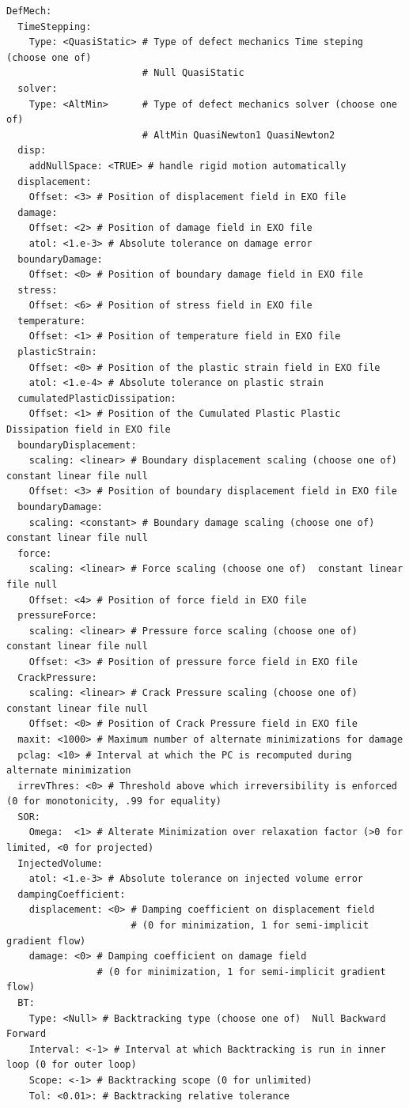 \documentclass[10pt,oneside]{report}
\begin{document}
\begin{verbatim}
DefMech:
  TimeStepping:
    Type: <QuasiStatic> # Type of defect mechanics Time steping (choose one of)  
                        # Null QuasiStatic
  solver:
    Type: <AltMin>      # Type of defect mechanics solver (choose one of)  
                        # AltMin QuasiNewton1 QuasiNewton2
  disp:
    addNullSpace: <TRUE> # handle rigid motion automatically  
  displacement:
    Offset: <3> # Position of displacement field in EXO file 
  damage:
    Offset: <2> # Position of damage field in EXO file 
    atol: <1.e-3> # Absolute tolerance on damage error 
  boundaryDamage:
    Offset: <0> # Position of boundary damage field in EXO file 
  stress:
    Offset: <6> # Position of stress field in EXO file 
  temperature:
    Offset: <1> # Position of temperature field in EXO file 
  plasticStrain:
    Offset: <0> # Position of the plastic strain field in EXO file 
    atol: <1.e-4> # Absolute tolerance on plastic strain
  cumulatedPlasticDissipation:
    Offset: <1> # Position of the Cumulated Plastic Plastic Dissipation field in EXO file 
  boundaryDisplacement:
    scaling: <linear> # Boundary displacement scaling (choose one of)  constant linear file null
    Offset: <3> # Position of boundary displacement field in EXO file 
  boundaryDamage:
    scaling: <constant> # Boundary damage scaling (choose one of)  constant linear file null
  force:
    scaling: <linear> # Force scaling (choose one of)  constant linear file null
    Offset: <4> # Position of force field in EXO file 
  pressureForce:
    scaling: <linear> # Pressure force scaling (choose one of)  constant linear file null
    Offset: <3> # Position of pressure force field in EXO file 
  CrackPressure:
    scaling: <linear> # Crack Pressure scaling (choose one of)  constant linear file null
    Offset: <0> # Position of Crack Pressure field in EXO file 
  maxit: <1000> # Maximum number of alternate minimizations for damage 
  pclag: <10> # Interval at which the PC is recomputed during alternate minimization 
  irrevThres: <0> # Threshold above which irreversibility is enforced (0 for monotonicity, .99 for equality) 
  SOR:
    Omega:  <1> # Alterate Minimization over relaxation factor (>0 for limited, <0 for projected) 
  InjectedVolume:
    atol: <1.e-3> # Absolute tolerance on injected volume error 
  dampingCoefficient:
    displacement: <0> # Damping coefficient on displacement field 
                      # (0 for minimization, 1 for semi-implicit gradient flow) 
    damage: <0> # Damping coefficient on damage field 
                # (0 for minimization, 1 for semi-implicit gradient flow) 
  BT:
    Type: <Null> # Backtracking type (choose one of)  Null Backward Forward
    Interval: <-1> # Interval at which Backtracking is run in inner loop (0 for outer loop) 
    Scope: <-1> # Backtracking scope (0 for unlimited) 
    Tol: <0.01>: # Backtracking relative tolerance 
\end{verbatim}
\end{document}
